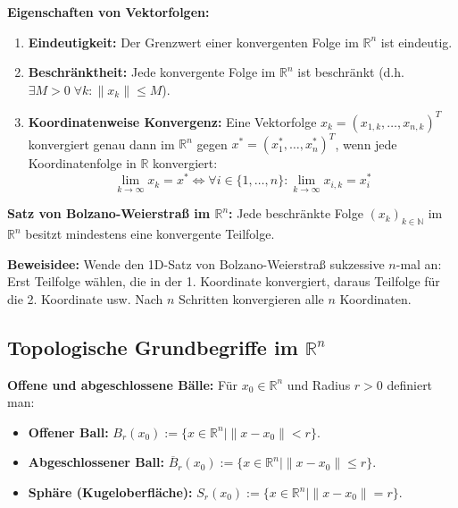 \begin{lemma}
    \textbf{Eigenschaften von Vektorfolgen:}
    \begin{enumerate}
        \item \textbf{Eindeutigkeit:} Der Grenzwert einer konvergenten Folge im $\mathbb{R}^n$ ist eindeutig.
        \item \textbf{Beschränktheit:} Jede konvergente Folge im $\mathbb{R}^n$ ist beschränkt (d.h. $\exists M > 0 \; \forall k: \|x_k\| \le M$).
        \item \textbf{Koordinatenweise Konvergenz:} Eine Vektorfolge $x_k = (x_{1,k}, \dots, x_{n,k})^T$ konvergiert genau dann im $\mathbb{R}^n$ gegen $x^* = (x_1^*, \dots, x_n^*)^T$, wenn jede Koordinatenfolge in $\mathbb{R}$ konvergiert:
        $$ \lim_{k \to \infty} x_k = x^* \iff \forall i \in \{1, \dots, n\}: \lim_{k \to \infty} x_{i,k} = x_i^* $$
    \end{enumerate}
\end{lemma}

\begin{theorem}
    \textbf{Satz von Bolzano-Weierstraß im $\mathbb{R}^n$:} Jede beschränkte Folge $(x_k)_{k \in \mathbb{N}}$ im $\mathbb{R}^n$ besitzt mindestens eine konvergente Teilfolge.
\end{theorem}

\begin{remark}
    \textbf{Beweisidee:} Wende den 1D-Satz von Bolzano-Weierstraß sukzessive $n$-mal an: Erst Teilfolge wählen, die in der 1. Koordinate konvergiert, daraus Teilfolge für die 2. Koordinate usw. Nach $n$ Schritten konvergieren alle $n$ Koordinaten.
\end{remark}

\subsection{Topologische Grundbegriffe im $\mathbb{R}^n$}

\begin{definition}
    \textbf{Offene und abgeschlossene Bälle:} Für $x_0 \in \mathbb{R}^n$ und Radius $r > 0$ definiert man:
    \begin{itemize}
        \item \textbf{Offener Ball:} $B_r(x_0) := \{x \in \mathbb{R}^n \mid \|x - x_0\| < r\}$.
        \item \textbf{Abgeschlossener Ball:} $\overline{B}_r(x_0) := \{x \in \mathbb{R}^n \mid \|x - x_0\| \le r\}$.
        \item \textbf{Sphäre (Kugeloberfläche):} $S_r(x_0) := \{x \in \mathbb{R}^n \mid \|x - x_0\| = r\}$.
    \end{itemize}
\end{definition}

